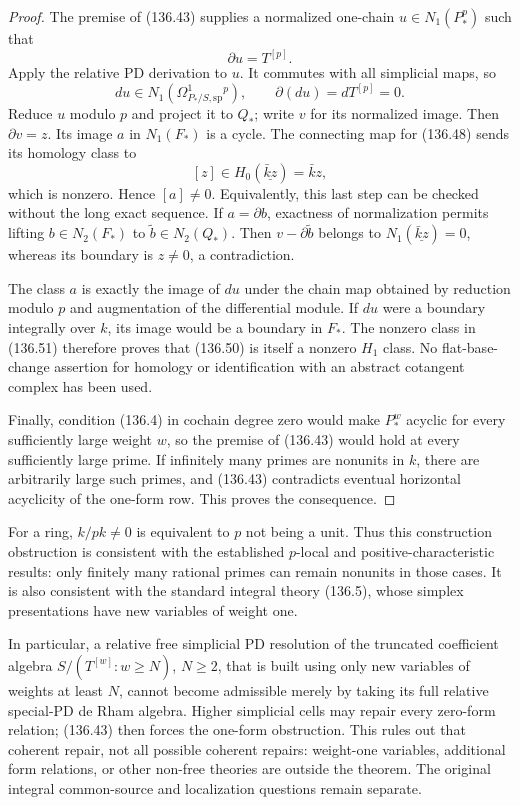 \documentclass[11pt,a4paper]{article}
\theoremstyle{definition}\newtheorem{definition}[theorem]{Definition}
\theoremstyle{remark}\newtheorem{remark}[theorem]{Remark}
\begin{document}
\begin{proof}
The premise of (136.43) supplies a normalized
one-chain $u\in N_1(P_*^p)$ such that
\[
                            \partial u=T^{[p]}.
                                                               \tag{136.49}
\]
Apply the relative PD derivation to $u$.  It
commutes with all simplicial maps, so
\[
 du\in N_1(\Omega^1_{P_*/S,\mathrm{sp}}{}^{\!p}),
                 \qquad\partial(du)=dT^{[p]}=0.           \tag{136.50}
\]
Reduce $u$ modulo $p$ and project it to $Q_*$;
write $v$ for its normalized image.  Then
$\partial v=z$.  Its image $a$ in $N_1(F_*)$
is a cycle.  The connecting map for (136.48)
sends its homology class to
\[
                         [z]\in H_0(\underline{\bar k z})
                                      =\bar k z,
                                                               \tag{136.51}
\]
which is nonzero.  Hence $[a]\ne0$.
Equivalently, this last step can be checked
without the long exact sequence.  If $a=\partial b$,
exactness of normalization permits lifting
$b\in N_2(F_*)$ to $\widetilde b\in N_2(Q_*)$.
Then $v-\partial\widetilde b$ belongs to
$N_1(\underline{\bar k z})=0$, whereas its
boundary is $z\ne0$, a contradiction.

The class $a$ is exactly the image of $du$ under
the chain map obtained by reduction modulo $p$
and augmentation of the differential module.
If $du$ were a boundary integrally over $k$,
its image would be a boundary in $F_*$.  The
nonzero class in (136.51) therefore proves
that (136.50) is itself a nonzero $H_1$ class.
No flat-base-change assertion for homology or
identification with an abstract cotangent complex
has been used.

Finally, condition (136.4) in cochain degree zero
would make $P_*^w$ acyclic for every sufficiently
large weight $w$, so the premise of (136.43)
would hold at every sufficiently large prime.
If infinitely many primes are nonunits in $k$,
there are arbitrarily large such primes, and
(136.43) contradicts eventual horizontal acyclicity
of the one-form row.  This proves the consequence.
\end{proof}

For a ring, $k/pk\ne0$ is equivalent to $p$ not
being a unit.  Thus this construction obstruction
is consistent with the established $p$-local and
positive-characteristic results: only finitely
many rational primes can remain nonunits in
those cases.  It is also consistent with the
standard integral theory (136.5), whose simplex
presentations have new variables of weight one.

In particular, a relative free simplicial PD
resolution of the truncated coefficient algebra
$S/(T^{[w]}:w\geq N)$, $N\geq2$, that is built
using only new variables of weights at least
$N$, cannot become admissible merely by taking
its full relative special-PD de Rham algebra.
Higher simplicial cells may repair every
zero-form relation; (136.43) then forces the
one-form obstruction.  This rules out that
coherent repair, not all possible coherent
repairs: weight-one variables, additional form
relations, or other non-free theories are
outside the theorem.  The original integral
common-source and localization questions remain
separate.
\end{document}
